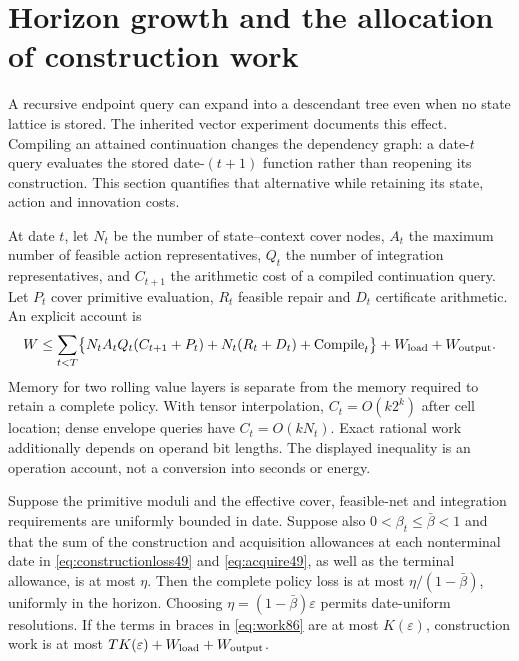 \section{Horizon growth and the allocation of construction work}\label{sec:resources86}
A recursive endpoint query can expand into a descendant tree even when no state lattice is stored. The inherited vector experiment documents this effect. Compiling an attained continuation changes the dependency graph: a date-$t$ query evaluates the stored date-$(t+1)$ function rather than reopening its construction. This section quantifies that alternative while retaining its state, action and innovation costs.

At date $t$, let $N_t$ be the number of state--context cover nodes, $A_t$ the maximum number of feasible action representatives, $Q_t$ the number of integration representatives, and $C_{t+1}$ the arithmetic cost of a compiled continuation query. Let $P_t$ cover primitive evaluation, $R_t$ feasible repair and $D_t$ certificate arithmetic. An explicit account is
\begin{equation}\label{eq:work86}
 W\le\sum_{t<T}\bigl\{N_tA_tQ_t(C_{t+1}+P_t)
             +N_t(R_t+D_t)+\operatorname{Compile}_t\bigr\}
       +W_{\rm load}+W_{\rm output}.
\end{equation}
Memory for two rolling value layers is separate from the memory required to retain a complete policy. With tensor interpolation, $C_t=O(k2^k)$ after cell location; dense envelope queries have $C_t=O(kN_t)$. Exact rational work additionally depends on operand bit lengths. The displayed inequality is an operation account, not a conversion into seconds or energy.

\begin{proposition}\label{prop:horizon86}
Suppose the primitive moduli and the effective cover, feasible-net and integration requirements are uniformly bounded in date. Suppose also $0<\beta_t\le\bar\beta<1$ and that the sum of the construction and acquisition allowances at each nonterminal date in \eqref{eq:constructionloss49} and \eqref{eq:acquire49}, as well as the terminal allowance, is at most $\eta$. Then the complete policy loss is at most $\eta/(1-\bar\beta)$, uniformly in the horizon. Choosing $\eta=(1-\bar\beta)\varepsilon$ permits date-uniform resolutions. If the terms in braces in \eqref{eq:work86} are at most $K(\varepsilon)$, construction work is at most $TK(\varepsilon)+W_{\rm load}+W_{\rm output}$.
\end{proposition}

